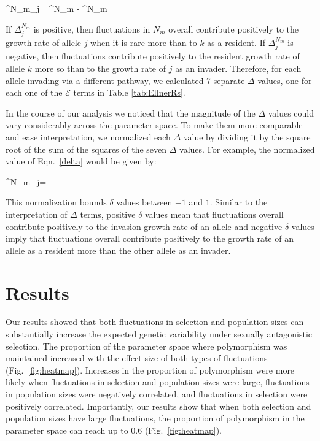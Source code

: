 \documentclass[12pt]{article}
\let\oldequation\equation
\let\oldendequation\endequation
\renewenvironment{equation}
  {\linenomathNonumbers\oldequation}
  {\oldendequation\endlinenomath}
\begin{document}
\begin{equation}
\Delta^{N_{m}}_{j}= ^{N_{m}} - ^{N_{m}}
\label{delta}
\end{equation}

If $\Delta^{N_{m}}_{j}$ is positive, then fluctuations in $N_{m}$ overall contribute positively to the growth rate of allele $j$ when it is rare more than to $k$ as a resident. If $\Delta^{N_{m}}_{j}$ is negative, then fluctuations contribute positively to the resident growth rate of allele $k$ more so than to the growth rate of $j$ as an invader. Therefore, for each allele invading via a different pathway, we calculated 7 separate $\Delta$ values, one for each one of the $\mathcal{E}$ terms in Table \ref{tab:EllnerRs}.


In the course of our analysis we noticed that the magnitude of the $\Delta$ values could vary considerably across the parameter space. To make them more comparable and ease interpretation, we normalized each $\Delta$ value by dividing it by the square root of the sum of the squares of the seven $\Delta$ values. For example, the normalized value of Eqn.~\ref{delta} would be given by:



\begin{equation}
  \delta^{N_{m}}_{j}= 
\end{equation}

This normalization bounds $\delta$ values between $-1$ and $1$. Similar to the interpretation of $\Delta$ terms, positive $\delta$ values mean that fluctuations overall contribute positively to the invasion growth rate of an allele and negative $\delta$ values imply that fluctuations overall contribute positively to the growth rate of an allele as a resident more than the other allele as an invader.


\section{Results}
Our results showed that both fluctuations in selection and population sizes can substantially increase the expected genetic variability under sexually antagonistic selection. The proportion of the parameter space where polymorphism was maintained increased with the effect size of both types of fluctuations (Fig.~\ref{fig:heatmap}). Increases in the proportion of polymorphism were more likely when fluctuations in selection and population sizes were large, fluctuations in population sizes were negatively correlated, and fluctuations in selection were positively correlated. Importantly, our results show that when both selection and population sizes have large fluctuations, the proportion of polymorphism in the parameter space can reach up to $0.6$ (Fig.~\ref{fig:heatmap}).
\end{document}
